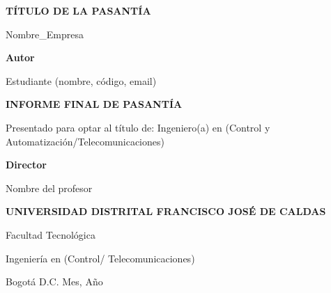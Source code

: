 \documentclass[12pt,letterpaper]{report}
\begin{document}
\newpage
\begin{titlepage}
\centering
\vspace*{2cm}

{\fontsize{14}{16}\selectfont\bfseries TÍTULO DE LA PASANTÍA\par}
\vspace{0.5cm}
{\fontsize{12}{14}\selectfont Nombre\_Empresa\par}

\vfill

{\fontsize{12}{14}\selectfont\bfseries Autor\par}
\vspace{0.3cm}
{\fontsize{12}{14}\selectfont Estudiante (nombre, código, email)\par}

\vspace{1cm}

{\fontsize{12}{14}\selectfont\bfseries INFORME FINAL DE PASANTÍA\par}

\vspace{1cm}

{\fontsize{12}{14}\selectfont Presentado para optar al título de: Ingeniero(a) en (Control y Automatización/Telecomunicaciones)\par}

\vfill

{\fontsize{12}{14}\selectfont\bfseries Director\par}
\vspace{0.2cm}
{\fontsize{12}{14}\selectfont Nombre del profesor\par}

\vfill

{\fontsize{12}{14}\selectfont\bfseries UNIVERSIDAD DISTRITAL FRANCISCO JOSÉ DE CALDAS\par}
\vspace{0.3cm}
{\fontsize{12}{14}\selectfont Facultad Tecnológica\par}
\vspace{0.2cm}
{\fontsize{12}{14}\selectfont Ingeniería en (Control/ Telecomunicaciones)\par}
{\fontsize{12}{14}\selectfont Bogotá D.C. Mes, Año\par}

\end{titlepage}

\newpage
\end{document}
